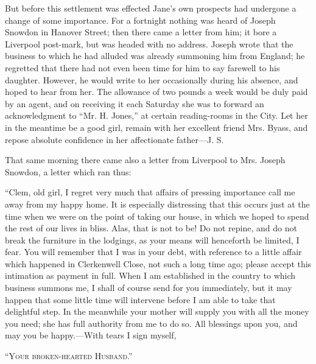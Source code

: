 But before this settlement was effected Jane's own prospects had
undergone a change of some importance. For a fortnight nothing was heard
of Joseph Snowdon in Hanover {\protect\hypertarget{237}{}{}}Street; then
there came a letter from him; it bore a Liverpool post-mark, but was
headed with no address. Joseph wrote that the business to which he had
alluded was already summoning him from England; he regretted that there
had not even been time for him to say farewell to his daughter. However,
he would write to her occasionally during his absence, and hoped to hear
from her. The allowance of two pounds a week would be duly paid by an
agent, and on receiving it each Saturday she was to forward an
acknowledgment to ``Mr. H. Jones,'' at certain reading-rooms in the
City. Let her in the meantime be a good girl, remain with her excellent
friend Mrs. Byass, and repose absolute confidence in her affectionate
father---J. S.

That same morning there came also a letter from Liverpool to Mrs. Joseph
Snowdon, a letter which ran thus:

``Clem, old girl, I regret very much that affairs of pressing importance
call me away from my happy home. It is especially distressing that this
occurs just at the time when we {\protect\hypertarget{238}{}{}}were on
the point of taking our house, in which we hoped to spend the rest of
our lives in bliss. Alas, that is not to be! Do not repine, and do not
break the furniture in the lodgings, as your means will henceforth be
limited, I fear. You will remember that I was in your debt, with
reference to a little affair which happened in Clerkenwell Close, not
such a long time ago; please accept this intimation as payment in full.
When I am established in the country to which business summons me, I
shall of course send for you immediately, but it may happen that some
little time will intervene before I am able to take that delightful
step. In the meanwhile your mother will supply you with all the money
you need; she has full authority from me to do so. All blessings upon
you, and may you be happy.---With tears I sign myself,

\textsc{``Your broken-hearted Husband.''}{}

